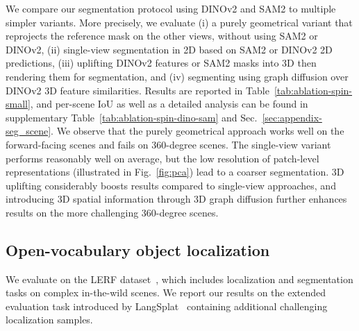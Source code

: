 We compare our segmentation protocol using DINOv2 and SAM2 to multiple simpler variants. More precisely, we evaluate (i) a purely geometrical variant that reprojects the reference mask on the other views, without using SAM2 or DINOv2, (ii) single-view segmentation in 2D based on SAM2 or DINOv2 2D predictions, (iii) uplifting DINOv2 features or SAM2 masks into 3D then rendering them for segmentation, and (iv) segmenting using graph diffusion over DINOv2 3D feature similarities. Results are reported in Table~\ref{tab:ablation-spin-small}, and per-scene IoU as well as a detailed analysis can be found in supplementary Table~\ref{tab:ablation-spin-dino-sam} and Sec.~\ref{sec:appendix-seg_scene}. We observe that the purely geometrical approach works well on the forward-facing scenes and fails on 360-degree scenes. The single-view variant performs reasonably well on average, but the low resolution of patch-level representations (illustrated in  Fig.~\ref{fig:pca}) lead to a coarser segmentation. 3D uplifting considerably boosts results compared to single-view approaches, and introducing 3D spatial information through 3D graph diffusion further enhances results on the more challenging 360-degree scenes.





\subsection{Open-vocabulary object localization}
\label{sec:exp-clip}

We evaluate on the LERF dataset~\citep{kerr2023lerf}, which includes localization and segmentation tasks on complex in-the-wild scenes. We report our results on the extended evaluation task introduced by LangSplat~\citep{qin2023langsplat} containing additional challenging localization samples.



